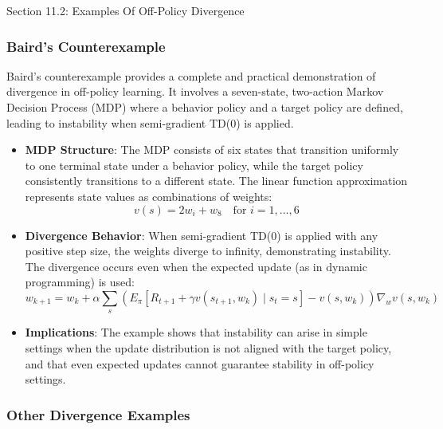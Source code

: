 \begin{notes}{Section 11.2: Examples Of Off-Policy Divergence}
\begin{highlight}
    \end{highlight}
    
    \subsubsection*{Baird's Counterexample}
    
    Baird's counterexample provides a complete and practical demonstration of divergence in off-policy learning. It involves a seven-state, two-action Markov Decision Process (MDP) where a behavior policy 
    and a target policy are defined, leading to instability when semi-gradient TD(0) is applied.
    
    \begin{highlight}
    
        \begin{itemize}
            \item \textbf{MDP Structure}: The MDP consists of six states that transition uniformly to one terminal state under a behavior policy, while the target policy consistently transitions to a different 
            state. The linear function approximation represents state values as combinations of weights:
            \[
            v(s) = 2w_i + w_8 \quad \text{for } i = 1, \dots, 6
            \]
            \item \textbf{Divergence Behavior}: When semi-gradient TD(0) is applied with any positive step size, the weights diverge to infinity, demonstrating instability. The divergence occurs even when 
            the expected update (as in dynamic programming) is used:
            \[
            w_{k+1} = w_k + \alpha \sum_s \left( E_\pi \left[ R_{t+1} + \gamma v(s_{t+1}, w_k) \mid s_t = s \right] - v(s, w_k) \right) \nabla_w v(s, w_k)
            \]
            \item \textbf{Implications}: The example shows that instability can arise in simple settings when the update distribution is not aligned with the target policy, and that even expected updates 
            cannot guarantee stability in off-policy settings.
        \end{itemize}
    
    \end{highlight}
    
    \subsubsection*{Other Divergence Examples}
    

\end{notes}

